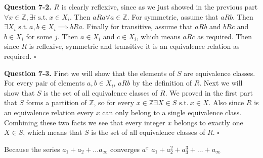 \documentclass[letterpaper, reqno,11pt]{article}
\newcommand{\ZZ}{\mathbb{Z}}
\newcommand{\st}{\text{ s.t.}\ }
\begin{document}
{\noindent\bf Question 7-2.} $R$ is clearly reflexive, since as we just showed in the previous part $\forall x\in\ZZ, \exists i\st x\in X_i$. Then $aRa\forall a\in\ZZ$. For symmetric, assume that $aRb$. Then $\exists X_i\st a,b\in X_i \implies bRa$. Finally for transitive, assume that $aRb$ and $bRc$ and $b\in X_i$ for some $j$. Then $a\in X_i$ and $c\in X_i$, which means $aRc$ as required. Then since $R$ is reflexive, symmetric and transitive it is an equivalence relation as required. $\square$

{\noindent\bf Question 7-3.} First we will show that the elements of $S$ are equivalence classes. For every pair of elements $a, b\in X_i$, $aRb$ by the definition of $R$. Next we will show that $S$ is the set of all equivalence classes of $R$. We proved in the first part that $S$ forms a partition of $\ZZ$, so for every $x\in\ZZ\exists X\in S\st x\in X$. Also since $R$ is an equivalence relation every $x$ can only belong to a single equivalence class. Combining these two facts we see that every integer $x$ belongs to exactly one $X\in S$, which means that $S$ is the set of all equivalence classes of $R$. $\square$

Because the series $ a_1+a_2+\ldots a_\infty$ converges $a^{x}$  $ a_1+a_2^2+a_3^3+\ldots+a_{\infty} $ 
\end{document}
